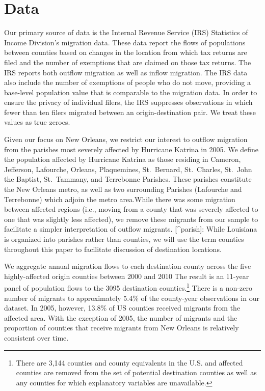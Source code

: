 \documentclass[]{article}
\let\rmarkdownfootnote\footnote%
\def\footnote{\protect\rmarkdownfootnote}
\begin{document}
\section{\texorpdfstring{Data \label{data}}{Data }}\label{data}

Our primary source of data is the Internal Revenue Service (IRS)
Statistics of Income Division's migration data. These data report the
flows of populations between counties based on changes in the location
from which tax returns are filed and the number of exemptions that are
claimed on those tax returns. The IRS reports both outflow migration as
well as inflow migration. The IRS data also include the number of
exemptions of people who do not move, providing a base-level population
value that is comparable to the migration data. In order to ensure the
privacy of individual filers, the IRS suppresses observations in which
fewer than ten filers migrated between an origin-destination pair. We
treat these values as true zeroes.

Given our focus on New Orleans, we restrict our interest to outflow
migration from the parishes most severely affected by Hurricane Katrina
in 2005. We define the population affected by Hurricane Katrina as those
residing in Cameron, Jefferson, Lafourche, Orleans, Plaquemines,
St.~Bernard, St.~Charles, St.~John the Baptist, St.~Tammany, and
Terrebonne Parishes. These parishes constitute the New Orleans metro, as
well as two surrounding Parishes (Lafourche and Terrebonne) which adjoin
the metro area.While there was some migration between affected regions
(i.e., moving from a county that was severely affected to one that was
slightly less affected), we remove these migrants from our sample to
facilitate a simpler interpretation of outflow migrants.
{[}\^{}parish{]}: While Louisiana is organized into parishes rather than
counties, we will use the term counties throughout this paper to
facilitate discussion of destination locations.

We aggregate annual migration flows to each destination county across
the five highly-affected origin counties between 2000 and 2010 The
result is an 11-year panel of population flows to the 3095 destination
counties.\footnote{There are 3,144 counties and county equivalents in
  the U.S. and affected counties are removed from the set of potential
  destination counties as well as any counties for which explanatory
  variables are unavailable.} There is a non-zero number of migrants to
approximately 5.4\% of the county-year observations in our dataset. In
2005, however, 13.8\% of US counties received migrants from the affected
area. With the exception of 2005, the number of migrants and the
proportion of counties that receive migrants from New Orleans is
relatively consistent over time.
\end{document}
